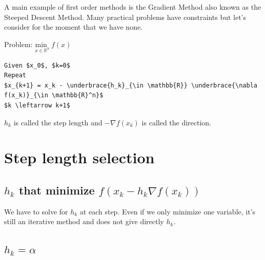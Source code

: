 A main example of first order methods is the Gradient Method also known as the Steeped Descent Method. Many practical problems have constraints but let's consider for the moment that we have none.  
 
Problem:  $\underset{x  \in \mathbb{R}^n}{\text{min }} \: f(x) $
 
\begin{lstlisting}[mathescape,caption=Gradient Algorithm]
Given $x_0$, $k=0$
Repeat
$x_{k+1} = x_k - \underbrace{h_k}_{\in \mathbb{R}} \underbrace{\nabla f(x_k)}_{\in \mathbb{R}^n}$
$k \leftarrow k+1$
\end{lstlisting}

$h_k$ is called the step length and $-\nabla f(x_k)$ is called the direction.


\section{Step length selection}

\subsection{ $h_k$ that minimize $f(x_k - h_k \nabla f(x_k))$} 

We have to solve for $h_k$ at each step. Even if we only minimize one variable, it's still an iterative method and does not give directly $h_k$. 

\subsection{$h_k = \alpha$}

